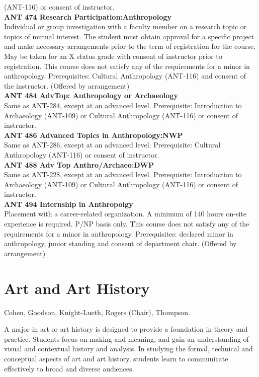 \documentclass[
  letterpaper,
]{scrbook}
\begin{document}
(ANT-116) or consent of instructor.\\
\textbf{ANT 474 Research Participation:Anthropology}\\
Individual or group investigation with a faculty member on a research
topic or topics of mutual interest. The student must obtain approval for
a specific project and make necessary arrangements prior to the term of
registration for the course. May be taken for an X status grade with
consent of instructor prior to registration. This course does not
satisfy any of the requirements for a minor in anthropology.
Prerequisites: Cultural Anthropology (ANT-116) and consent of the
instructor. (Offered by arrangement)\\
\textbf{ANT 484 AdvTop: Anthropology or Archaeology}\\
Same as ANT-284, except at an advanced level. Prerequisite: Introduction
to Archaeology (ANT-109) or Cultural Anthropology (ANT-116) or consent
of instructor.\\
\textbf{ANT 486 Advanced Topics in Anthropology:NWP}\\
Same as ANT-286, except at an advanced level. Prerequisite: Cultural
Anthropology (ANT-116) or consent of instructor.\\
\textbf{ANT 488 Adv Top Anthro/Archaeo:DWP}\\
Same as ANT-228, except at an advanced level. Prerequisite: Introduction
to Archaeology (ANT-109) or Cultural Anthropology (ANT-116) or consent
of instructor.\\
\textbf{ANT 494 Internship in Anthropolgy}\\
Placement with a career-related organization. A minimum of 140 hours
on-site experience is required. P/NP basis only. This course does not
satisfy any of the requirements for a minor in anthropology.
Prerequisites: declared minor in anthropology, junior standing and
consent of department chair. (Offered by arrangement)

\section{Art and Art History}\label{art-and-art-history}

Cohen, Goodson, Knight-Lueth, Rogers (Chair), Thompson.

A major in art or art history is designed to provide a foundation in
theory and practice. Students focus on making and meaning, and gain an
understanding of visual and contextual history and analysis. In studying
the formal, technical and conceptual aspects of art and art history,
students learn to communicate effectively to broad and diverse
audiences.
\end{document}
